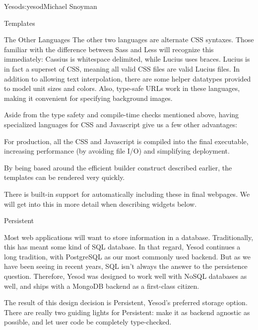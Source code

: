 \begin{aosachapter}{Yesod}{s:yesod}{Michael Snoyman}
\begin{aosasect1}{Templates}
\begin{aosasect2}{The Other Languages}
The other two languages are alternate CSS syntaxes. Those familiar
with the difference between Sass and Less will recognize this
immediately: Cassius is whitespace delimited, while Lucius uses
braces. Lucius is in fact a superset of CSS, meaning all valid CSS
files are valid Lucius files. In addition to allowing text
interpolation, there are some helper datatypes provided to model unit
sizes and colors. Also, type-safe URLs work in these languages, making
it convenient for specifying background images.

Aside from the type safety and compile-time checks mentioned above,
having specialized languages for CSS and Javascript give us a few
other advantages:

\begin{aosaitemize}

\item For production, all the CSS and Javascript is compiled into the
  final executable, increasing performance (by avoiding file I/O) and
  simplifying deployment.

\item By being based around the efficient builder construct described
  earlier, the templates can be rendered very quickly.

\item There is built-in support for automatically including these in
  final webpages. We will get into this in more detail when describing
  widgets below.

\end{aosaitemize}

\end{aosasect2}

\end{aosasect1}

\begin{aosasect1}{Persistent}

Most web applications will want to store information in a
database. Traditionally, this has meant some kind of SQL database. In
that regard, Yesod continues a long tradition, with PostgreSQL as our
most commonly used backend. But as we have been seeing in recent
years, SQL isn't always the answer to the persistence
question. Therefore, Yesod was designed to work well with NoSQL
databases as well, and ships with a MongoDB backend as a first-class
citizen.

The result of this design decision is Persistent, Yesod's preferred
storage option. There are really two guiding lights for Persistent:
make it as backend agnostic as possible, and let user code be
completely type-checked.


\end{aosasect1}
\end{aosachapter}

